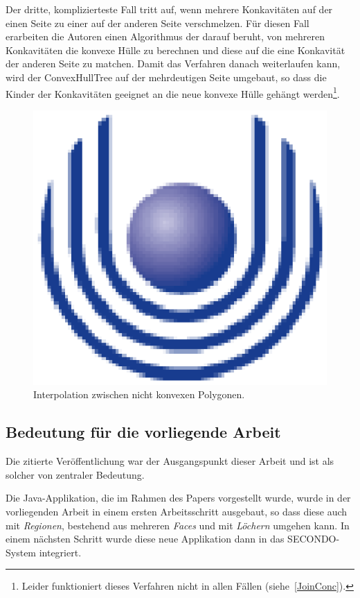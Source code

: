 Der dritte, komplizierteste Fall tritt auf, wenn mehrere Konkavitäten auf der einen Seite zu einer auf der anderen Seite verschmelzen. Für diesen Fall erarbeiten die Autoren einen Algorithmus der darauf beruht, von mehreren Konkavitäten die konvexe Hülle zu berechnen und diese auf die eine Konkavität der anderen Seite zu matchen. Damit das Verfahren danach weiterlaufen kann, wird der ConvexHullTree auf der mehrdeutigen Seite umgebaut, so dass die Kinder der Konkavitäten geeignet an die neue konvexe Hülle gehängt werden\footnote{Leider funktioniert dieses Verfahren nicht in allen Fällen (siehe~\vref{JoinConc}).}.

\begin{figure}
	\centering
	\includegraphics{feu_logo2.eps}
	\caption{Interpolation zwischen nicht konvexen Polygonen.}
	\label{fig:Interpolationnonconvex}
\end{figure}

\subsection{Bedeutung für die vorliegende Arbeit}

Die zitierte Veröffentlichung war der Ausgangspunkt dieser Arbeit und ist als solcher von zentraler Bedeutung.

Die Java-Applikation, die im Rahmen des Papers vorgestellt wurde, wurde in der vorliegenden Arbeit in einem ersten Arbeitsschritt ausgebaut, so dass diese auch mit \textit{Regionen}, bestehend aus mehreren \textit{Faces} und mit \textit{Löchern} umgehen kann. In einem nächsten Schritt wurde diese neue Applikation dann in das SECONDO-System integriert.

